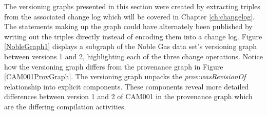 \begin{figure}
	\centering
\end{figure}
The versioning graphs presented in this section were created by extracting triples from the associated change log which will be covered in Chapter \ref{ch:changelog}.
The statements making up the graph could have alternately been published by writing out the triples directly instead of encoding them into a change log.
Figure \ref{NobleGraph1} displays a subgraph of the Noble Gas data set's versioning graph between versions 1 and 2, highlighting each of the three change operations.
Notice how the versioning graph differs from the provenance graph in Figure \ref{CAM001ProvGraph}.
The versioning graph unpacks the \textit{prov:wasRevisionOf} relationship into explicit components.
These components reveal more detailed differences between version 1 and 2 of CAM001 in the provenance graph which are the differing compilation activities.
\begin{figure}
	\centering
\end{figure}
